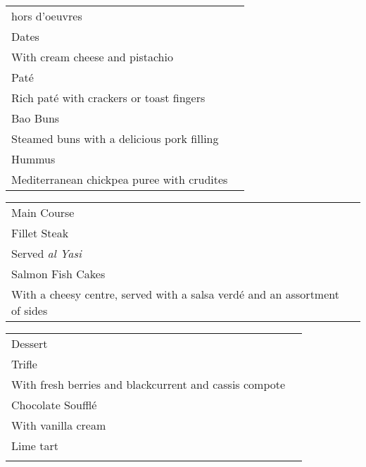 \documentclass[12pt]{article}
\makeatletter
\newcommand*\ColText[1]{\textcolor{Goldenrod3}{#1}}
\newenvironment{Group}[1]
  {\noindent\begin{tabular*}{\textwidth}{@{}p{.8\linewidth}@{\extracolsep{\fill}}r@{}}
    {\fontsize{24}{29}\selectfont\ColText{#1}}\\[0.8em]}
  {\end{tabular*}}
\newcommand*\Entry[2]{%
  \sffamily#1 & #2}
\newcommand*\Expl[1]{%
  \hspace*{1em}\footnotesize #1}
\makeatother
\begin{document}
\vfill
\begin{Group}{hors d'oeuvres}
\Entry{Dates}{} \\
\Expl{With cream cheese and pistachio} \\
\Entry{Pat\'e}{} \\
\Expl{Rich pat\'e with crackers or toast fingers } \\
\Entry{Bao Buns}{} \\
\Expl{Steamed buns with a delicious pork filling} \\
\Entry{Hummus}{} \\
\Expl{Mediterranean chickpea puree with crudites} \\
\end{Group}
\vfill



\begin{Group}{Main Course}
\Entry{Fillet Steak}{} \\ 
\Expl{Served \emph{al Yasi}} \\
\Entry{Salmon Fish Cakes}{} \\ 
\Expl{With a cheesy centre, served with a salsa verd\'e and an assortment of sides} \\
\end{Group}

\vfill

\begin{Group}{Dessert}
\Entry{Trifle}{} \\ 
\Expl{With fresh berries and blackcurrent and cassis compote} \\
\Entry{Chocolate Souffl\'e}{} \\ 
\Expl{With vanilla cream} \\
\Entry{Lime tart}{} \\ 
\Expl{} \\
\end{Group}
\vfill
\end{document}
